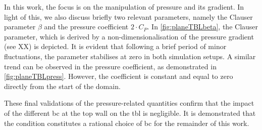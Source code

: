 \begin{figure}[H]
\centering
\begin{subfigure}[t]{0.495\textwidth}
    \subcaption{}
    \centering
    
    \label{fig:planeTBLbeta}
\end{subfigure}
\hfill
\begin{subfigure}[t]{0.495\textwidth}
    \centering
    \subcaption{}
    
    \label{fig:planeTBLpress}
\end{subfigure}
\caption{}
\end{figure}

In this work, the focus is on the manipulation of pressure and its gradient. In light of this,  we also discuss briefly two relevant parameters, namely the Clauser parameter $\beta$ and the pressure coefficient $2 \cdot C_P$.
In \autoref{fig:planeTBLbeta}, the Clauser parameter, which is derived by a non-dimensionalisation of the pressure gradient (see XX) is depicted.
It is evident that following a brief period of minor fluctuations,  the parameter stabilises  at zero in both simulation setups.
A similar trend can be observed in the pressure coefficient, as demonstrated  in \autoref{fig:planeTBLpress}.
However, the coefficient is  constant and equal to zero directly from the start of the domain. 

These final validations of the pressure-related quantities confirm that the impact of the different \acrshort{bc} at the top wall on the \acrshort{tbl} is negligible.
It is demonstrated that the  condition constitutes a rational choice of \acrshort{bc} for the remainder of this work.


